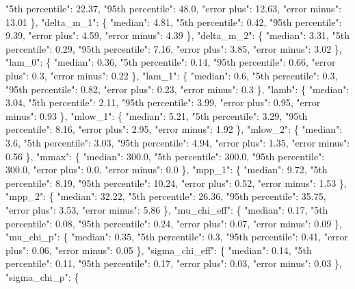 {{        "5th percentile": 22.37, %
        "95th percentile": 48.0, %
        "error plus": 12.63, %
        "error minus": 13.01%
      \}, %
      "delta\_m\_1": \{%
        "median": 4.81, %
        "5th percentile": 0.42, %
        "95th percentile": 9.39, %
        "error plus": 4.59, %
        "error minus": 4.39%
      \}, %
      "delta\_m\_2": \{%
        "median": 3.31, %
        "5th percentile": 0.29, %
        "95th percentile": 7.16, %
        "error plus": 3.85, %
        "error minus": 3.02%
      \}, %
      "lam\_0": \{%
        "median": 0.36, %
        "5th percentile": 0.14, %
        "95th percentile": 0.66, %
        "error plus": 0.3, %
        "error minus": 0.22%
      \}, %
      "lam\_1": \{%
        "median": 0.6, %
        "5th percentile": 0.3, %
        "95th percentile": 0.82, %
        "error plus": 0.23, %
        "error minus": 0.3%
      \}, %
      "lamb": \{%
        "median": 3.04, %
        "5th percentile": 2.11, %
        "95th percentile": 3.99, %
        "error plus": 0.95, %
        "error minus": 0.93%
      \}, %
      "mlow\_1": \{%
        "median": 5.21, %
        "5th percentile": 3.29, %
        "95th percentile": 8.16, %
        "error plus": 2.95, %
        "error minus": 1.92%
      \}, %
      "mlow\_2": \{%
        "median": 3.6, %
        "5th percentile": 3.03, %
        "95th percentile": 4.94, %
        "error plus": 1.35, %
        "error minus": 0.56%
      \}, %
      "mmax": \{%
        "median": 300.0, %
        "5th percentile": 300.0, %
        "95th percentile": 300.0, %
        "error plus": 0.0, %
        "error minus": 0.0%
      \}, %
      "mpp\_1": \{%
        "median": 9.72, %
        "5th percentile": 8.19, %
        "95th percentile": 10.24, %
        "error plus": 0.52, %
        "error minus": 1.53%
      \}, %
      "mpp\_2": \{%
        "median": 32.22, %
        "5th percentile": 26.36, %
        "95th percentile": 35.75, %
        "error plus": 3.53, %
        "error minus": 5.86%
      \}, %
      "mu\_chi\_eff": \{%
        "median": 0.17, %
        "5th percentile": 0.08, %
        "95th percentile": 0.24, %
        "error plus": 0.07, %
        "error minus": 0.09%
      \}, %
      "mu\_chi\_p": \{%
        "median": 0.35, %
        "5th percentile": 0.3, %
        "95th percentile": 0.41, %
        "error plus": 0.06, %
        "error minus": 0.05%
      \}, %
      "sigma\_chi\_eff": \{%
        "median": 0.14, %
        "5th percentile": 0.11, %
        "95th percentile": 0.17, %
        "error plus": 0.03, %
        "error minus": 0.03%
      \}, %
      "sigma\_chi\_p": \{%
}}

